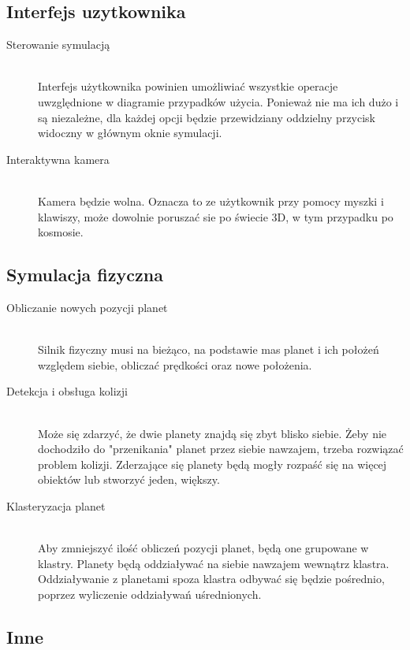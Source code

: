 \subsection{Interfejs uzytkownika}

\begin{description}
	\item[Sterowanie symulacją] \hfill \\
	Interfejs użytkownika powinien umożliwiać wszystkie operacje uwzględnione w diagramie przypadków użycia. Ponieważ nie ma ich dużo i są niezależne, dla każdej opcji będzie przewidziany oddzielny przycisk widoczny w głównym oknie symulacji.
	\item[Interaktywna kamera] \hfill \\
	Kamera będzie wolna. Oznacza to ze użytkownik przy pomocy myszki i klawiszy, może dowolnie poruszać sie po świecie 3D, w tym przypadku po kosmosie.
\end{description}

\subsection{Symulacja fizyczna}

\begin{description}
	\item[Obliczanie nowych pozycji planet] \hfill \\
	Silnik fizyczny musi na bieżąco, na podstawie mas planet i ich położeń względem siebie, obliczać prędkości oraz nowe położenia. 
	\item[Detekcja i obsługa kolizji] \hfill \\
	Może się zdarzyć, że dwie planety znajdą się zbyt blisko siebie. Żeby nie dochodziło do "przenikania" planet przez siebie nawzajem, trzeba rozwiązać problem kolizji. Zderzające się planety będą mogły rozpaść się na więcej obiektów lub stworzyć jeden, większy.
	\item[Klasteryzacja planet] \hfill \\
	Aby zmniejszyć ilość obliczeń pozycji planet, będą one grupowane w klastry. Planety będą oddziaływać na siebie nawzajem wewnątrz klastra. Oddziaływanie z planetami spoza klastra odbywać się będzie pośrednio, poprzez wyliczenie oddziaływań uśrednionych.

\end{description}

\subsection{Inne}

